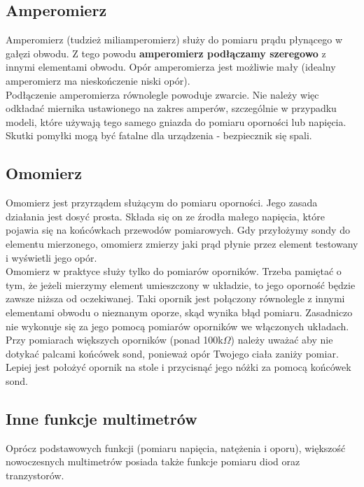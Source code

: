 \documentclass{pdfBooklets}
\begin{document}
\subsection{Amperomierz}
Amperomierz (tudzież miliamperomierz) służy do pomiaru prądu płynącego w gałęzi obwodu. Z tego powodu
\textbf{amperomierz podłączamy szeregowo} z innymi elementami obwodu. Opór amperomierza jest możliwie mały (idealny amperomierz
ma nieskończenie niski opór).
\\

Podłączenie amperomierza równolegle powoduje zwarcie. Nie należy więc odkładać miernika ustawionego na zakres amperów, szczególnie
w przypadku modeli, które używają tego samego gniazda do pomiaru oporności lub napięcia. Skutki pomyłki mogą być fatalne dla
urządzenia - bezpiecznik się spali.

\subsection{Omomierz}
Omomierz jest przyrządem służącym do pomiaru oporności. Jego zasada działania jest dosyć prosta. Składa się on ze źrodła małego napięcia, które pojawia się na końcówkach przewodów pomiarowych. Gdy przyłożymy sondy do elementu mierzonego, omomierz zmierzy jaki prąd płynie przez element testowany i wyświetli jego opór.
\\

Omomierz w praktyce służy tylko do pomiarów oporników. Trzeba pamiętać o tym, że jeżeli mierzymy element umieszczony w układzie,
to jego oporność będzie zawsze niższa od oczekiwanej. Taki opornik jest połączony równolegle z innymi elementami obwodu o
nieznanym oporze, skąd wynika błąd pomiaru.
Zasadniczo nie wykonuje się za jego pomocą pomiarów oporników we włączonych układach.
\\

Przy pomiarach większych oporników (ponad 100k$\Omega$) należy uważać aby nie dotykać palcami końcówek sond, ponieważ opór Twojego ciała
zaniży pomiar. Lepiej jest położyć opornik na stole i przycisnąć jego nóżki za pomocą końcówek sond.


\subsection{Inne funkcje multimetrów}
Oprócz podstawowych funkcji (pomiaru napięcia, natężenia i oporu)\footnotemark, większość nowoczesnych multimetrów posiada także funkcje pomiaru diod oraz tranzystorów.
\\
\end{document}
